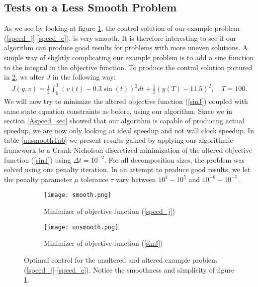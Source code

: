\subsection{Tests on a Less Smooth Problem}
As we see by looking at figure \ref{smootha}, the control solution of our example problem (\ref{speed_j}-\ref{speed_e}), is very smooth. It is therefore interesting to see if our algorithm can produce good results for problems with more uneven solutions. A simple way of slightly complicating our example problem is to add a sine function to the integral in the objective function. To produce the control solution pictured in \ref{smoothb}, we alter $J$ in the following way:
\begin{align}
J(y,v) = \frac{1}{2}\int_0^{T}(v(t)-0.3\sin(t))^2dt + \frac{1}{2}(y(T)-11.5)^2, \quad T=100. \label{sinJ}
\end{align}
We will now try to minimize the altered objective function (\ref{sinJ}) coupled with same state equation constraints as before, using our algorithm. Since we in section \ref{Aspeed_sec} showed that our algorithm is capable of producing actual speedup, we are now only looking at ideal speedup and not wall clock speedup. In table \ref{unsmoothTab} we present results gained by applying our algorithmic framework to a Crank-Nicholson discretized minimization of the altered objective function (\ref{sinJ}) using $\Delta t = 10^{-2}$. For all decomposition sizes, the problem was solved using one penalty iteration. In an attempt to produce good results, we let the penalty parameter $\mu$ tolerance $\tau$ vary between $10^4-10^5$ and $10^{-6}-10^{-5}$.
\\
\begin{figure}[h]
\centering
\begin{subfigure}{.5\textwidth}
  \centering
  \texttt{[image: smooth.png]}
  \caption{Minimizer of objective function (\ref{speed_j})}
  \label{smootha}
\end{subfigure}%
\begin{subfigure}{.5\textwidth}
  \centering
  \texttt{[image: unsmooth.png]}
  \caption{Minimizer of objective function (\ref{sinJ})}
  \label{smoothb}
\end{subfigure}
\caption{Optimal control for the unaltered and altered example problem (\ref{speed_j}-\ref{speed_e}). Notice the smoothness and simplicity of figure \ref{smootha}.}
\label{smooth}
\end{figure}
